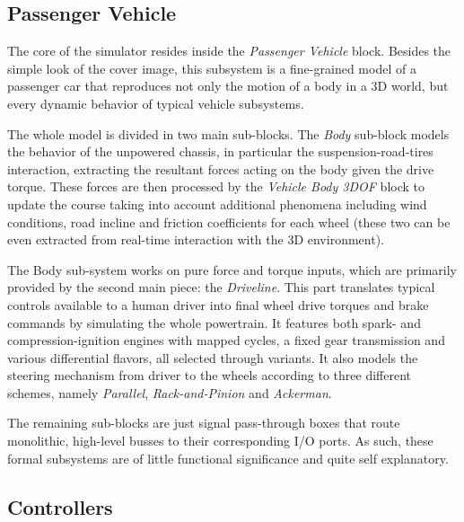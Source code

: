 		\subsection{Passenger Vehicle}
		\label{ssec:vs-env-passveh}

		The core of the simulator resides inside the \emph{Passenger Vehicle} block.
		Besides the simple look of the cover image, this subsystem is a fine-grained model of a passenger car that reproduces not only the motion of a body in a 3D world,
		but every dynamic behavior of typical vehicle subsystems.

		The whole model is divided in two main sub-blocks. The \emph{Body} sub-block models the behavior of the unpowered chassis, in particular the suspension-road-tires
		interaction, extracting the resultant forces acting on the body given the drive torque. These forces are then processed by the \emph{Vehicle Body 3DOF} block to
		update the course taking into account additional phenomena including wind conditions, road incline and friction coefficients for each wheel (these two can be even
		extracted from real-time interaction with the 3D environment).

		The Body sub-system works on pure force and torque inputs, which are primarily provided by the second main piece: the \emph{Driveline}.
		This part translates typical controls available to a human driver into final wheel drive torques and brake commands by simulating the whole powertrain.
		It features both spark- and compression-ignition engines with mapped cycles, a fixed gear transmission and various differential flavors, all selected through variants.
		It also models the steering mechanism from driver to the wheels according to three different schemes, namely \emph{Parallel}, \emph{Rack-and-Pinion} and
		\emph{Ackerman}.

		The remaining sub-blocks are just signal pass-through boxes that route monolithic, high-level busses to their corresponding I/O ports. As such, these formal subsystems
		are of little functional significance and quite self explanatory.


		\subsection{Controllers}

